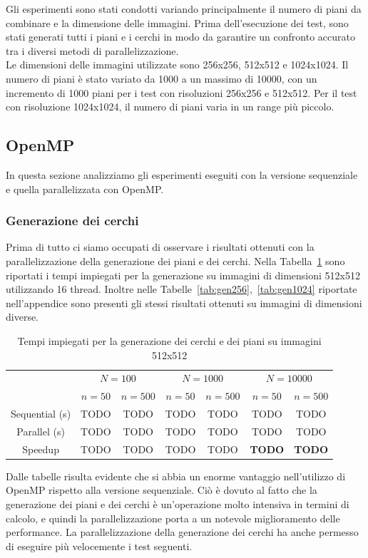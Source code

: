 Gli esperimenti sono stati condotti variando principalmente il numero di piani da combinare e la dimensione delle immagini.
Prima dell'esecuzione dei test, sono stati generati tutti i piani e i cerchi in modo da garantire un confronto accurato
tra i diversi metodi di parallelizzazione.\\
Le dimensioni delle immagini utilizzate sono 256x256, 512x512 e 1024x1024.
Il numero di piani è stato variato da 1000 a un massimo di 10000, con un incremento di 1000 piani per i test con risoluzioni 256x256 e 512x512.
Per il test con risoluzione 1024x1024, il numero di piani varia in un range più piccolo.

\subsection{OpenMP}\label{subsec:test_openmp}
In questa sezione analizziamo gli esperimenti eseguiti con la versione sequenziale e quella parallelizzata con OpenMP.
\subsubsection{Generazione dei cerchi}
Prima di tutto ci siamo occupati di osservare i risultati ottenuti con la parallelizzazione della generazione dei piani e dei cerchi.
Nella Tabella~\ref{tab:gen512} sono riportati i tempi impiegati per la generazione su immagini di dimensioni 512x512 utilizzando 16 thread.
Inoltre nelle Tabelle~\ref{tab:gen256},~\ref{tab:gen1024} riportate nell'appendice sono presenti gli stessi risultati ottenuti su immagini di dimensioni diverse.
\begin{table}[H]
    \centering
    \begin{tabular}{c|c|c|c|c|c|c|}
        & \multicolumn{2}{|c|}{$N = 100$} & \multicolumn{2}{|c|}{$N = 1000$} & \multicolumn{2}{|c|}{$N = 10000$} \\
        & $n=50$ & $n=500$ & $n=50$ & $n=500$ & $n=50$ & $n=500$ \\
        \hline
        Sequential (s) & TODO & TODO & TODO & TODO & TODO & TODO \\
        Parallel (s) & TODO & TODO & TODO & TODO & TODO & TODO \\
        Speedup & TODO & TODO & TODO & TODO & \textbf{TODO} & \textbf{TODO} \\
    \end{tabular}
    \caption{\label{tab:gen512}Tempi impiegati per la generazione dei cerchi e dei piani su immagini 512x512}
\end{table}
Dalle tabelle risulta evidente che si abbia un enorme vantaggio nell'utilizzo di OpenMP rispetto alla versione sequenziale.
Ciò è dovuto al fatto che la generazione dei piani e dei cerchi è un'operazione molto intensiva in termini di calcolo,
e quindi la parallelizzazione porta a un notevole miglioramento delle performance.
La parallelizzazione della generazione dei cerchi ha anche permesso di eseguire più velocemente i test seguenti.

